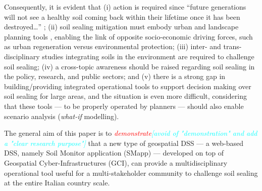 \documentclass[APA,LATO1COL,doublespace]{WileyNJD-v2}
\newcommand{\toberevised}[1]{\emph{\textcolor{red}{#1}}} %
\newcommand{\reviewer}[1]{\emph{\textcolor{cyan}{#1}}}   %
\begin{document}
Consequently, it is evident that 
(i) action is required since ``future generations will not see a healthy soil coming back within their lifetime once it has been destroyed\dots'' \citep{SWD12}; 
(ii) soil sealing mitigation must embody urban and landscape planning tools \citep{Artmann14}, enabling the link of opposite socio-economic driving forces, such as urban regeneration versus environmental protection; 
(iii) inter- and trans-disciplinary studies integrating soils in the environment are required to challenge soil sealing;
(iv) a cross-topic awareness should be raised regarding soil sealing in the policy, research, and public sectors; 
and (v) there is a strong gap in building/providing integrated operational tools to support decision making over soil sealing for large areas, and the situation is even more difficult, considering that these tools --- to be properly operated by planners --- should also enable scenario analysis (\textit{what-if} modelling).

The general aim of this paper is to \toberevised{demonstrate}\reviewer{[avoid of "demonstration" and add a "clear research purpose"]} that a new type of geospatial DSS --- a web-based DSS, namely Soil Monitor application (SMapp) --- developed on top of Geospatial Cyber-Infrastructures (GCI), can provide a multidisciplinary operational tool useful for a multi-stakeholder community to challenge soil sealing at the entire Italian country scale. 
\end{document}

